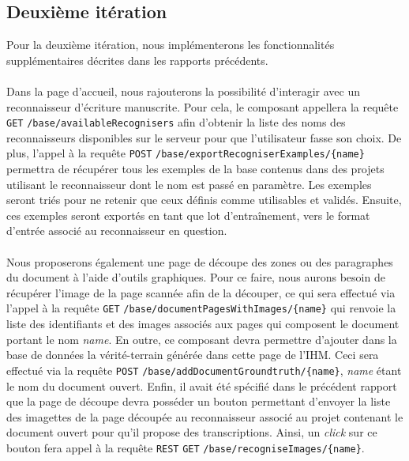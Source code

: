 
\newpage{}

\subsection{Deuxième itération}

Pour la deuxième itération, nous implémenterons les fonctionnalités supplémentaires décrites dans les rapports précédents.

\paragraph{}
Dans la page d'accueil, nous rajouterons la possibilité d'interagir avec un reconnaisseur d'écriture manuscrite. Pour cela, le composant appellera la requête \texttt{GET} \texttt{/base/availableRecognisers} afin d'obtenir la liste des noms des reconnaisseurs disponibles sur le serveur pour que l'utilisateur fasse son choix. De plus, l'appel à la requête \texttt{POST} \texttt{/base/exportRecogniserExamples/\{name\}} permettra de récupérer tous les exemples de la base contenus dans des projets utilisant le reconnaisseur dont le nom est passé en paramètre. Les exemples seront triés pour ne retenir que ceux définis comme utilisables et validés. Ensuite, ces exemples seront exportés en tant que lot d'entraînement, vers le format d'entrée associé au reconnaisseur en question.

\paragraph{}
Nous proposerons également une page de découpe des zones ou des paragraphes du document à l’aide d’outils graphiques. Pour ce faire, nous aurons besoin de récupérer l'image de la page scannée afin de la découper, ce qui sera effectué via l'appel à la requête \texttt{GET} \texttt{/base/documentPagesWithImages/\{name\}} qui renvoie la liste des identifiants et des images associés aux pages qui composent le document portant le nom \textit{name}. En outre, ce composant devra permettre d'ajouter dans la base de données la vérité-terrain générée dans cette page de l'IHM. Ceci sera effectué via la requête \texttt{POST} \texttt{/base/addDocumentGroundtruth/\{name\}}, \textit{name} étant le nom du document ouvert. Enfin, il avait été spécifié dans le précédent rapport que la page de découpe devra posséder un bouton permettant d'envoyer la liste des imagettes de la page découpée au reconnaisseur associé au projet contenant le document ouvert pour qu'il propose des transcriptions. Ainsi, un \textit{click} sur ce bouton fera appel à la requête \texttt{REST} \texttt{GET} \texttt{/base/recogniseImages/\{name\}}.

